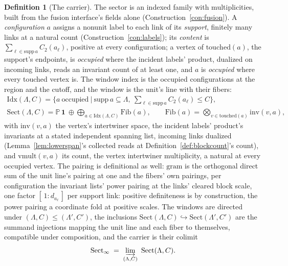 \documentclass[11pt]{article}
\theoremstyle{definition}
\newtheorem{definition}{Definition}
\begin{document}
\begin{definition}[The carrier]\label{def:carrier}
The sector is an
indexed family with multiplicities, built from the fusion
interface's fields alone (Construction~\ref{con:fusion}). A
\emph{configuration} $a$ assigns a nonunit label to each link of its
\emph{support}, finitely many links at a natural count
(Construction~\ref{con:labels}); its \emph{content} is
$\sum_{\ell\in\mathrm{supp}\,a}C_2(a_\ell)$, positive at every
configuration; a vertex of $\mathrm{touched}(a)$, the support's
endpoints, is \emph{occupied} where the incident labels'
product, dualized on incoming links, reads an invariant count of at
least one, and
$a$ is \emph{occupied} where every touched vertex is. The window
index is the occupied configurations at the region and the cutoff,
and the window is the unit's line with their fibers:
\[
\begin{gathered}
\mathrm{Idx}(\Lambda,C)=\Big\{a\ \text{occupied}\ \Big|\
\mathrm{supp}\,a\subseteq\Lambda,\
\sum_{\ell\in\mathrm{supp}\,a}C_2(a_\ell)\le C\Big\},\\
\mathrm{Sect}(\Lambda,C)=\mathbb P\,\mathbf 1\ \oplus
\bigoplus_{a\in\mathrm{Idx}(\Lambda,C)}\mathrm{Fib}(a),
\qquad
\mathrm{Fib}(a)=\bigotimes_{v\in\mathrm{touched}(a)}\mathrm{inv}(v,a),
\end{gathered}
\]
with
$\mathrm{inv}(v,a)$ the vertex's intertwiner space, the incident
labels' product's invariants at a stated independent spanning
list, incoming links dualized (Lemma~\ref{lem:lowerspan}'s
collected reads at Definition~\ref{def:blockcount}'s count), and
$\mathrm{vmult}(v,a)$ its count, the vertex intertwiner
multiplicity, a natural at every occupied vertex. The
pairing is definitional as well: $\mathrm{gram}$ is the orthogonal direct sum
of the unit line's pairing at one and the fibers' own pairings,
per configuration the invariant lists' power pairing at the links'
cleared block scale, one factor $[\,1:d_{a_\ell}\,]$ per support
link: positive definiteness is by construction, the power pairing
a coordinate fold at positive scales. The windows are directed under
$(\Lambda,C)\le(\Lambda',C')$, the inclusions
$\mathrm{Sect}(\Lambda,C)\hookrightarrow\mathrm{Sect}(\Lambda',C')$ are the
summand injections mapping the unit line and each fiber to
themselves, compatible under
composition, and the carrier is
their colimit
\[
\mathrm{Sect}_\infty\;=\;\varinjlim_{(\Lambda,C)}\ \mathrm{Sect}(\Lambda,C).
\]
\end{definition}
\end{document}
